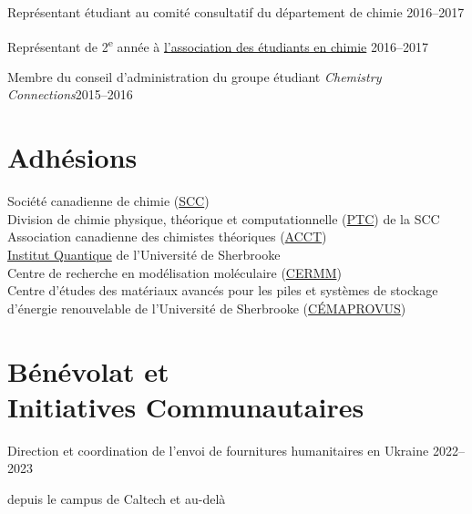 \documentclass[margin,line]{res}
\newenvironment{list1}{
 \begin{list}{\ding{113}}{%
  \setlength{\itemsep}{0in}
  \setlength{\parsep}{0in} \setlength{\parskip}{0in}
  \setlength{\topsep}{0in} \setlength{\partopsep}{0in} 
  \setlength{\leftmargin}{0.17in}}}{\end{list}}
\begin{document}
\begin{resume}
\vspace*{-1mm}

Représentant étudiant au comité consultatif du département de chimie \hfill{2016--2017}

\vspace*{-1mm}

Représentant de 2\textsuperscript{e} année à \href{https://csu.sa.utoronto.ca/events-2013-2014/previous-executive-teams/exceutive-team-2015-2016/}{l'association des étudiants en chimie} \hfill{2016--2017}

\vspace*{-1mm}

Membre du conseil d'administration du groupe étudiant {\em Chemistry Connections}\hfill {2015--2016}

\section{\sc Adhésions}

Société canadienne de chimie (\href{https://www.cheminst.ca/about/about-csc/}{SCC})\\
Division de chimie physique, théorique et computationnelle (\href{https://www.cheminst.ca/physical-theoretical-and-computational-division-ptc/}{PTC}) de la SCC\\
Association canadienne des chimistes théoriques (\href{http://www.catc.ca/members}{ACCT})\\
\href{https://www.usherbrooke.ca/iq/fr/a-propos/equipe/corps-professoral/roman-korol}{Institut Quantique} de l'Université de Sherbrooke\\
Centre de recherche en modélisation moléculaire (\href{https://www.concordia.ca/research/molecular-modeling.html}{CERMM})\\
Centre d'études des matériaux avancés pour les piles et systèmes de stockage d'énergie renouvelable de l'Université de Sherbrooke (\href{https://www.usherbrooke.ca/recherche/fr/udes/regroupements/centres}{CÉMAPROVUS})

\section{\sc Bénévolat et \\Initiatives Communautaires}
Direction et coordination de l'envoi de fournitures humanitaires en Ukraine \href{https://www.caltech.edu/about/news/organizing-aid-to-his-native-ukraine}{}\hfill{2022--2023}

\begin{list1}
\item[]depuis le campus de Caltech et au-delà
\end{list1}


\end{resume}
\end{document}
